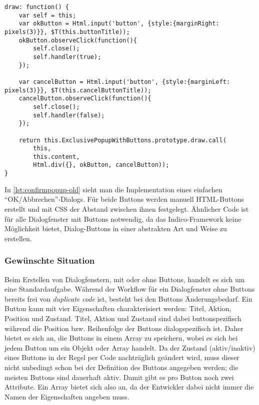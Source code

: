 \begin{lstlisting}[label=lst:confirmpopup-old,caption=Indico-Code zum Erstellen eines einfachen Dialogfensters]
draw: function() {
    var self = this;
    var okButton = Html.input('button', {style:{marginRight: pixels(3)}}, $T(this.buttonTitle));
    okButton.observeClick(function(){
        self.close();
        self.handler(true);
    });

    var cancelButton = Html.input('button', {style:{marginLeft: pixels(3)}}, $T(this.cancelButtonTitle));
    cancelButton.observeClick(function(){
        self.close();
        self.handler(false);
    });

    return this.ExclusivePopupWithButtons.prototype.draw.call(
        this,
        this.content,
        Html.div({}, okButton, cancelButton));
}
\end{lstlisting}

In \autoref{lst:confirmpopup-old} sieht man die Implementation eines einfachen
\enquote{OK/Abbrechen}-Dialogs. Für beide Buttons werden manuell HTML-Buttons erstellt und mit CSS
der Abstand zwischen ihnen festgelegt. Ähnlicher Code ist für alle Dialogfenster mit Buttons
notwendig, da das Indico-Framework keine Möglichkeit bietet, Dialog-Buttons in einer abstrakten Art
und Weise zu erstellen.

\subsubsection{Gewünschte Situation}

Beim Erstellen von Dialogfenstern, mit oder ohne Buttons, handelt es sich um eine
Standardaufgabe. Während der Workflow für ein Dialogfenster ohne Buttons bereits frei von
\emph{duplicate code} ist, besteht bei den Buttons Änderungsbedarf. Ein Button kann mit vier
Eigenschaften charakterisiert werden: Titel, Aktion, Position und Zustand. Titel, Aktion und Zustand
sind dabei buttonspezifisch während die Position bzw. Reihenfolge der Buttons dialogspezifisch ist.
Daher bietet es sich an, die Buttons in einem Array zu speichern, wobei es sich bei jedem Button um
ein Objekt oder Array handelt. Da der Zustand (aktiv/inaktiv) eines Buttons in der Regel per Code
nachträglich geändert wird, muss dieser nicht unbedingt schon bei der Definition des Buttons
angegeben werden; die meisten Buttons sind dauerhaft aktiv. Damit gibt es pro Button noch zwei
Attribute. Ein Array bietet sich also an, da der Entwickler dabei nicht immer die Namen der
Eigenschaften angeben muss.

